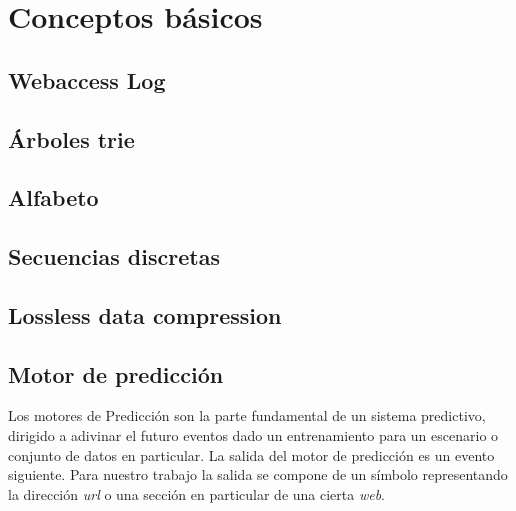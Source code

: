 \section[Conceptos básicos]{Conceptos básicos} \label{conceptos-basicos}



\subsection{Webaccess Log}\label{concept-accesslog}


\subsection{Árboles trie} \label{concept-trie}



\subsection{Alfabeto} \label{concept-alphabet}


\subsection{Secuencias discretas}\label{concept-discret-seq}



\subsection{Lossless data compression} \label{concept-LDC}



\subsection{Motor de predicción}\label{concept-enginepredict}

	Los motores de Predicción son la parte fundamental de un sistema predictivo, dirigido a adivinar el futuro eventos dado un entrenamiento para un escenario o conjunto de datos en particular. La salida del motor de predicción es un evento siguiente. Para nuestro trabajo la salida se compone de un símbolo representando la dirección \emph{url} o una sección en particular de una cierta \emph{web}. 

 


